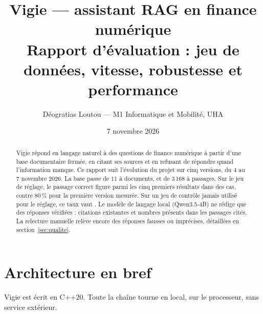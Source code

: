 \documentclass[11pt,a4paper]{article}
\title{\textbf{Vigie} --- assistant RAG en finance numérique\\[4pt]
\large Rapport d'évaluation : jeu de données, vitesse, robustesse et performance}
\author{Déogratias Loutou --- M1 Informatique et Mobilité, UHA}
\date{7 novembre 2026}
\begin{document}
\maketitle

\begin{abstract}
Vigie répond en langage naturel à des questions de finance numérique à partir d'une base documentaire fermée, en citant ses sources et en refusant de répondre quand l'information manque. Ce rapport suit l'évolution du projet sur cinq versions, du 4 au 7 novembre 2026. La base passe de 11 à \docsFinal{} documents, et de 3\,168 à \passagesFinal{} passages. Sur le jeu de réglage, le passage correct figure parmi les cinq premiers résultats dans \regTopCinqFinal{} des cas, contre 80\,\% pour la première version mesurée. Sur un jeu de contrôle jamais utilisé pour le réglage, ce taux vaut \valTopCinqFinal{}. Le modèle de langage local (Qwen3.5-4B) ne rédige que des réponses vérifiées : citations existantes et nombres présents dans les passages cités. La relecture manuelle relève encore des réponses fausses ou imprécises, détaillées en section~\ref{sec:qualite}.
\end{abstract}

\section{Architecture en bref}

Vigie est écrit en C++20. Toute la chaîne tourne en local, sur le processeur, sans service extérieur.

\begin{center}
\end{center}
\end{document}
